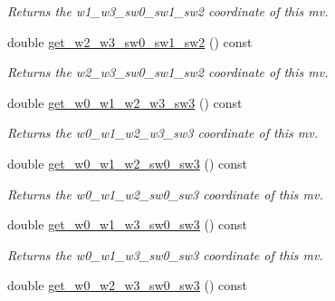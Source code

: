 \begin{DoxyCompactItemize}
\begin{DoxyCompactList}\small\item\em Returns the w1\-\_\-w3\-\_\-sw0\-\_\-sw1\-\_\-sw2 coordinate of this mv. \end{DoxyCompactList}\item 
\hypertarget{classe3ga_1_1mv_af7444110ad43a45d3fbef36b3359ac6d}{double \hyperlink{classe3ga_1_1mv_af7444110ad43a45d3fbef36b3359ac6d}{get\-\_\-w2\-\_\-w3\-\_\-sw0\-\_\-sw1\-\_\-sw2} () const }\label{classe3ga_1_1mv_af7444110ad43a45d3fbef36b3359ac6d}

\begin{DoxyCompactList}\small\item\em Returns the w2\-\_\-w3\-\_\-sw0\-\_\-sw1\-\_\-sw2 coordinate of this mv. \end{DoxyCompactList}\item 
\hypertarget{classe3ga_1_1mv_ae7ed941e9d891a55fc2ce3dac909569e}{double \hyperlink{classe3ga_1_1mv_ae7ed941e9d891a55fc2ce3dac909569e}{get\-\_\-w0\-\_\-w1\-\_\-w2\-\_\-w3\-\_\-sw3} () const }\label{classe3ga_1_1mv_ae7ed941e9d891a55fc2ce3dac909569e}

\begin{DoxyCompactList}\small\item\em Returns the w0\-\_\-w1\-\_\-w2\-\_\-w3\-\_\-sw3 coordinate of this mv. \end{DoxyCompactList}\item 
\hypertarget{classe3ga_1_1mv_aaa84dd0996e8e332906f718ddfbec9ee}{double \hyperlink{classe3ga_1_1mv_aaa84dd0996e8e332906f718ddfbec9ee}{get\-\_\-w0\-\_\-w1\-\_\-w2\-\_\-sw0\-\_\-sw3} () const }\label{classe3ga_1_1mv_aaa84dd0996e8e332906f718ddfbec9ee}

\begin{DoxyCompactList}\small\item\em Returns the w0\-\_\-w1\-\_\-w2\-\_\-sw0\-\_\-sw3 coordinate of this mv. \end{DoxyCompactList}\item 
\hypertarget{classe3ga_1_1mv_a8dc479d66d3118077712ed346b761e11}{double \hyperlink{classe3ga_1_1mv_a8dc479d66d3118077712ed346b761e11}{get\-\_\-w0\-\_\-w1\-\_\-w3\-\_\-sw0\-\_\-sw3} () const }\label{classe3ga_1_1mv_a8dc479d66d3118077712ed346b761e11}

\begin{DoxyCompactList}\small\item\em Returns the w0\-\_\-w1\-\_\-w3\-\_\-sw0\-\_\-sw3 coordinate of this mv. \end{DoxyCompactList}\item 
\hypertarget{classe3ga_1_1mv_a7e637196d84c056303600675ba8e7c8a}{double \hyperlink{classe3ga_1_1mv_a7e637196d84c056303600675ba8e7c8a}{get\-\_\-w0\-\_\-w2\-\_\-w3\-\_\-sw0\-\_\-sw3} () const }\label{classe3ga_1_1mv_a7e637196d84c056303600675ba8e7c8a}


\end{DoxyCompactItemize}
